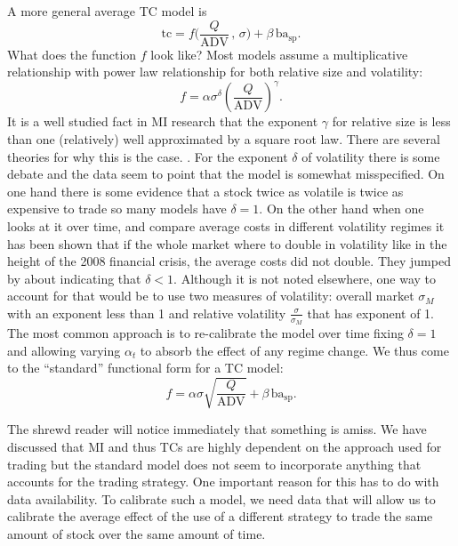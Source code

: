 A more general average TC model is
        \begin{equation}\label{eq:tc_3}
        	\text{tc}= f \big(\frac{Q}{\text{ADV}}\,,\, \sigma \big) + \beta \,\text{ba}_{\text{sp}}.
        \end{equation}
What does the function $f$ look like? Most models assume a multiplicative relationship with power law relationship for both relative size and volatility:
        \begin{equation}\label{eq:tc_3}
        		f =\alpha  \sigma^{\delta} \left( \frac{Q}{\text{ADV}} \right)^{\gamma}.
        \end{equation}
It is a well studied fact in MI research that the exponent $\gamma$ for relative size is less than one (relatively) well approximated by a square root law. There are several theories for why this is the case. . For the exponent $\delta$ of volatility there is some debate and the data seem to point that the model is somewhat misspecified. On one hand there is some evidence that a stock twice as volatile is twice as expensive to trade so many models have $\delta = 1$. On the other hand when one looks at it over time, and compare average costs in different volatility regimes it has been shown that if the whole market where to double in volatility like in the height of the 2008 financial crisis, the average costs did not double. They jumped by about  indicating that $\delta <1$. Although it is not noted elsewhere, one way to account for that would be to use two measures of volatility: overall market  $\sigma_M$ with an exponent less than 1 and relative volatility $\frac{\sigma}{\sigma_M}$ that has exponent of 1. The most common approach is to re-calibrate the model over time fixing $\delta=1$ and allowing varying $\alpha_t$ to absorb the effect of any regime change. We thus come to the ``standard'' functional form for a TC model:
        \begin{equation}\label{eq:tc_3}
        		f =\alpha  \sigma \sqrt{\frac{Q}{\text{ADV}}} +  \beta\, \text{ba}_{\text{sp}}.
        \end{equation}


The shrewd reader will notice immediately that something is amiss. We have discussed that MI and thus TCs are highly dependent on the approach used for trading but the standard model does not seem to incorporate anything that accounts for the trading strategy. One important reason for this has to do with data availability. To calibrate such a model, we need data that will allow us to calibrate the average effect of the use of a different strategy to trade the same amount of stock over the same amount of time. 


